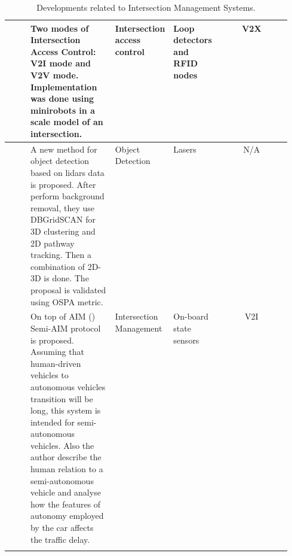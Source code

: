 \begin{center}
\begin{longtable}{|c|p{0.3\linewidth}|p{0.15\linewidth}|p{0.1\linewidth}|c|}
\cite{Guerrero-Ibanez2013} &
Two modes of Intersection Access Control: V2I mode and V2V mode. Implementation was done using minirobots in a scale model of an intersection. &
Intersection access control &
Loop detectors and RFID nodes &
V2X \\
\hline


\cite{Meissner2013b} &
A new method for object detection based on lidars data is proposed. After perform background removal, they use DBGridSCAN for 3D clustering and 2D pathway tracking. Then a combination of 2D-3D is done. The proposal is validated using OSPA metric. &
Object Detection &
Lasers &
N/A \\
\hline

\cite{Au2015} &
On top of AIM (\cite{Dresner2008}) Semi-AIM protocol is proposed. Assuming that human-driven vehicles to autonomous vehicles transition will be long, this system is intended for semi-autonomous vehicles. Also the author describe the human relation to a semi-autonomous vehicle and analyse how the features of autonomy employed by the car affects the traffic delay. &
Intersection Management &
On-board state sensors &
V2I \\
\hline








\hline
\caption{Developments related to Intersection Management Systems.}
\label{reviewtable}
\end{longtable}
\end{center}